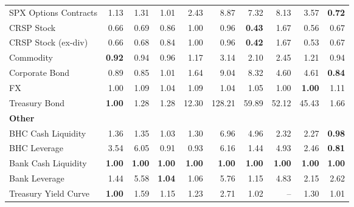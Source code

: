 \begin{table}[htbp]
\begin{tabular}{@{}lrrrrrrrrr@{}}
SPX Options Contracts & 1.13 & 1.31 & 1.01 & 2.43 & 8.87 & 7.32 & 8.13 & 3.57 & \textbf{0.72} \\
CRSP Stock & 0.66 & 0.69 & 0.86 & 1.00 & 0.96 & \textbf{0.43} & 1.67 & 0.56 & 0.67 \\
CRSP Stock (ex-div) & 0.66 & 0.68 & 0.84 & 1.00 & 0.96 & \textbf{0.42} & 1.67 & 0.53 & 0.67 \\
Commodity & \textbf{0.92} & 0.94 & 0.96 & 1.17 & 3.14 & 2.10 & 2.45 & 1.21 & 0.94 \\
Corporate Bond & 0.89 & 0.85 & 1.01 & 1.64 & 9.04 & 8.32 & 4.60 & 4.61 & \textbf{0.84} \\
FX & 1.00 & 1.09 & 1.04 & 1.09 & 1.04 & 1.05 & 1.00 & \textbf{1.00} & 1.11 \\
Treasury Bond & \textbf{1.00} & 1.28 & 1.28 & 12.30 & 128.21 & 59.89 & 52.12 & 45.43 & 1.66 \\
\midrule
\multicolumn{10}{l}{\textbf{Other}} \\
BHC Cash Liquidity & 1.36 & 1.35 & 1.03 & 1.30 & 6.96 & 4.96 & 2.32 & 2.27 & \textbf{0.98} \\
BHC Leverage & 3.54 & 6.05 & 0.91 & 0.93 & 6.16 & 1.44 & 4.93 & 2.46 & \textbf{0.81} \\
Bank Cash Liquidity & \textbf{1.00} & \textbf{1.00} & \textbf{1.00} & \textbf{1.00} & \textbf{1.00} & \textbf{1.00} & \textbf{1.00} & \textbf{1.00} & \textbf{1.00} \\
Bank Leverage & 1.44 & 5.58 & \textbf{1.04} & 1.06 & 5.76 & 1.15 & 4.83 & 2.15 & 2.62 \\
Treasury Yield Curve & \textbf{1.00} & 1.59 & 1.15 & 1.23 & 2.71 & 1.02 & -- & 1.30 & 1.01 \\
\bottomrule
\end{tabular}
\vspace{0.1cm}

\end{table}
